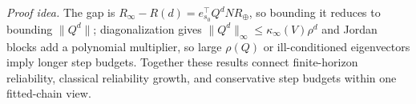 \noindent\emph{Proof idea.}
The gap is $R_\infty-R(d)=e_{s_0}^{\top}Q^dNR_\oplus$, so bounding it
reduces to bounding $\|Q^d\|$; diagonalization gives
$\|Q^d\|_\infty\le\kappa_\infty(V)\rho^d$ and Jordan blocks add a
polynomial multiplier, so large $\rho(Q)$ or ill-conditioned
eigenvectors imply longer step budgets. Together these results connect
finite-horizon reliability, classical reliability growth, and
conservative step budgets within one fitted-chain view.

